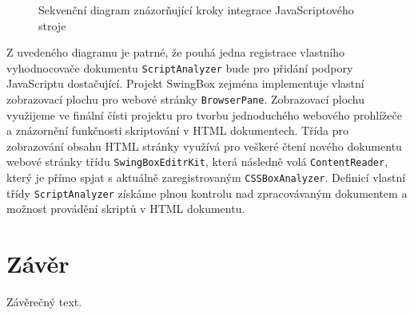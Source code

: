 \begin{figure}[H]
  \begin{center}
    \caption{Sekvenční diagram znázorňující kroky integrace JavaScriptového stroje}
    \label{Figure.SwingBoxIntegrationDesign}
  \end{center}
\end{figure}

Z uvedeného diagramu je patrné, že pouhá jedna registrace vlastního vyhodnocovače dokumentu \texttt{ScriptAnalyzer} bude pro přidání podpory JavaScriptu dostačující. Projekt SwingBox zejména implementuje vlastní zobrazovací plochu pro webové stránky \texttt{BrowserPane}. Zobrazovací plochu využijeme ve finální čísti projektu pro tvorbu jednoduchého webového prohlížeče a znázornění funkčnosti skriptování v HTML dokumentech. Třída pro zobrazování obsahu HTML stránky využívá pro veškeré čtení nového dokumentu webové stránky třídu \texttt{SwingBoxEditrKit}, která následně volá \texttt{ContentReader}, který je přímo spjat s aktuálně zaregistrovaným \texttt{CSSBoxAnalyzer}. Definicí vlastní třídy \texttt{ScriptAnalyzer} získáme plnou kontrolu nad zpracovávaným dokumentem a možnost provádění skriptů v HTML dokumentu. 

\chapter{Závěr}
\label{Chapter.Final}
Závěrečný text.
